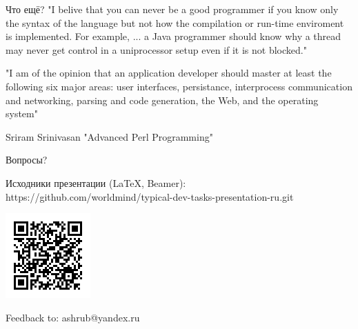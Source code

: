 \documentclass[aspectratio=169]{beamer}
\begin{document}
\begin{frame}{Что ещё?}
"I belive that you can never be a good programmer if you know only the syntax of the language but not how the compilation or run-time enviroment is implemented. For example, ... a Java programmer should know why a thread may never get control in a uniprocessor setup even if it is not blocked."

"I am of the opinion that an application developer should master at least the following six major areas: user interfaces, persistance, interprocess communication and networking, parsing and code generation, the Web, and the operating system"

Sriram Srinivasan "Advanced Perl Programming"
\end{frame}

\begin{frame}{Вопросы?}
\begin{block}{Исходники презентации (LaTeX, Beamer):}
https://github.com/worldmind/typical-dev-tasks-presentation-ru.git
\begin{center}
\includegraphics{qr-git-url.png}
\end{center}
\end{block}
\begin{block}{Feedback to: ashrub@yandex.ru}
\end{block}

\end{frame}
\end{document}
